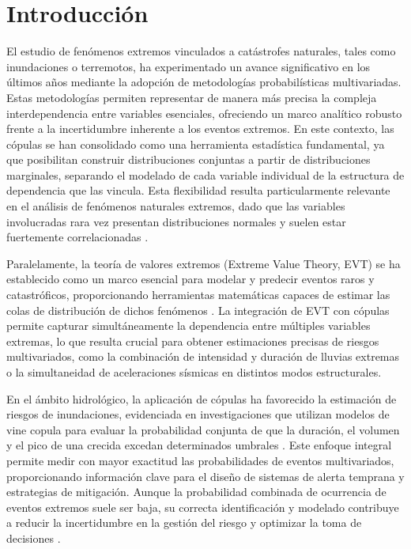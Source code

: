 \documentclass[12pt, a4paper]{article}
\begin{document}
\section*{Introducción}

El estudio de fenómenos extremos vinculados a catástrofes naturales, tales como inundaciones o terremotos, ha experimentado un avance significativo en los últimos años mediante la adopción de metodologías probabilísticas multivariadas. Estas metodologías permiten representar de manera más precisa la compleja interdependencia entre variables esenciales, ofreciendo un marco analítico robusto frente a la incertidumbre inherente a los eventos extremos. En este contexto, las cópulas se han consolidado como una herramienta estadística fundamental, ya que posibilitan construir distribuciones conjuntas a partir de distribuciones marginales, separando el modelado de cada variable individual de la estructura de dependencia que las vincula. Esta flexibilidad resulta particularmente relevante en el análisis de fenómenos naturales extremos, dado que las variables involucradas rara vez presentan distribuciones normales y suelen estar fuertemente correlacionadas \cite{DelfinerGutierrez2025,PerezGarcia2004}.

Paralelamente, la teoría de valores extremos (Extreme Value Theory, EVT) se ha establecido como un marco esencial para modelar y predecir eventos raros y catastróficos, proporcionando herramientas matemáticas capaces de estimar las colas de distribución de dichos fenómenos \cite{Siddiqui2022,DelfinerGutierrez2025}. La integración de EVT con cópulas permite capturar simultáneamente la dependencia entre múltiples variables extremas, lo que resulta crucial para obtener estimaciones precisas de riesgos multivariados, como la combinación de intensidad y duración de lluvias extremas o la simultaneidad de aceleraciones sísmicas en distintos modos estructurales.

En el ámbito hidrológico, la aplicación de cópulas ha favorecido la estimación de riesgos de inundaciones, evidenciada en investigaciones que utilizan modelos de vine copula para evaluar la probabilidad conjunta de que la duración, el volumen y el pico de una crecida excedan determinados umbrales \cite{DelfinerGutierrez2025}. Este enfoque integral permite medir con mayor exactitud las probabilidades de eventos multivariados, proporcionando información clave para el diseño de sistemas de alerta temprana y estrategias de mitigación. Aunque la probabilidad combinada de ocurrencia de eventos extremos suele ser baja, su correcta identificación y modelado contribuye a reducir la incertidumbre en la gestión del riesgo y optimizar la toma de decisiones \cite{PerezGarcia2004}.
\end{document}
